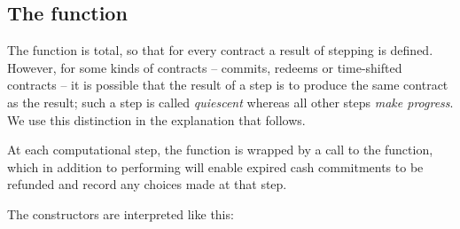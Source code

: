 \documentclass[
      acmsmall
    , screen
    , review=true
  ]{acmart}
\begin{document}
\subsection{The  function}


The  function is total, so that for every contract a result of stepping is defined. However, for some kinds of contracts -- commits, redeems or time-shifted contracts -- it is possible that the result of a step is to produce the same contract as the result; such a step is called \emph{quiescent} whereas all other steps \emph{make progress}. We use this distinction in the explanation that follows.


At each computational step, the  function is wrapped by a call to the  function, which in addition to performing  will enable expired cash commitments to be refunded and record any choices made at that step.


The constructors are interpreted like this:
\end{document}
